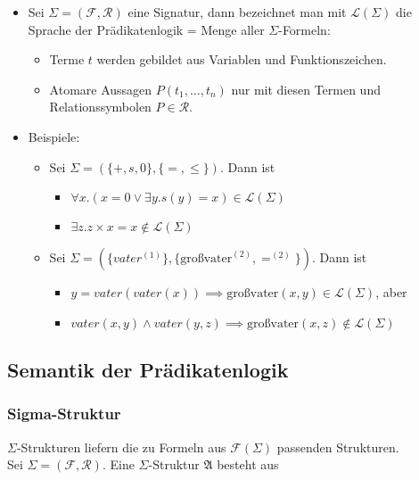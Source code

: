 \documentclass{scrartcl}
\begin{document}
\begin{itemize}
	\item Sei $\Sigma = (\mathcal{F}, \mathcal{R})$ eine Signatur, dann bezeichnet man mit $\mathcal{L}(\Sigma)$ die Sprache der Prädikatenlogik = Menge aller $\Sigma$-Formeln:
	\begin{itemize}
		\item Terme $t$ werden gebildet aus Variablen und Funktionszeichen.
		\item Atomare Aussagen $P(t_1, \ldots, t_n)$ nur mit diesen Termen und Relationssymbolen $P \in \mathcal{R}$.
	\end{itemize}
	\item Beispiele:
	\begin{itemize}
		\item Sei $\Sigma = (\{ +, s, 0 \}, \{ =, \leq \})$. Dann ist
		\begin{itemize}
			 \item $\forall x.(x = 0 \vee \exists y.s(y) = x) \in \mathcal{L}(\Sigma)$
			 \item $\exists z.z \times x = x \not \in \mathcal{L}(\Sigma)$
		\end{itemize}
		\item Sei $\Sigma = (\{ vater^{(1)} \}, \{ \text{großvater}^{(2)}, =^{(2)} \})$. Dann ist
		\begin{itemize}
			\item $y = vater(vater(x)) \implies \text{großvater}(x,y) \in \mathcal{L}(\Sigma)$, aber
			\item $vater(x,y) \wedge vater(y,z) \implies \text{großvater}(x,z) \not \in \mathcal{L}(\Sigma)$
		\end{itemize}
	\end{itemize}
\end{itemize}

\subsection{Semantik der Prädikatenlogik}

\subsubsection{Sigma-Struktur}

$\Sigma$-Strukturen liefern die zu Formeln aus $\mathcal{F}(\Sigma)$ passenden Strukturen. \\
Sei $\Sigma = (\mathcal{F}, \mathcal{R})$. Eine $\Sigma$-Struktur $\mathfrak{A}$ besteht aus
\end{document}

